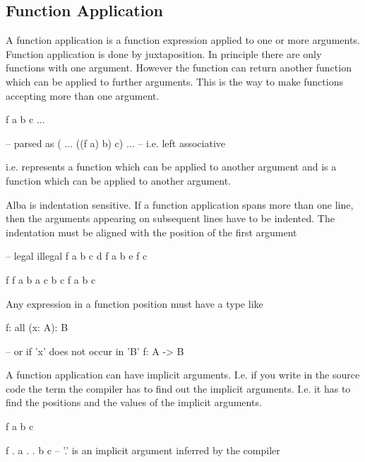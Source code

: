 \subsection{Function Application}

A function application is a function expression applied to one or more
arguments. Function application is done by juxtaposition. In principle there are
only functions with one argument. However the function can return another
function which can be applied to further arguments. This is the way to make
functions accepting more than one argument.

\begin{alba}
    f a b c ...

    -- parsed as
    ( ... ((f a) b) c) ...  -- i.e. left associative
\end{alba}
i.e.  represents a function which can be applied to another argument
and  is a function which can be applied to another argument.

Alba is indentation sensitive. If a function application spans more than one
line, then the arguments appearing on subsequent  lines have to be indented. The
indentation must be aligned with the position of the first argument
\begin{alba}
    -- legal                                illegal
    f a b c d                               f  a b
      e f                                    c

    f                                       f  a b
        a                                        c
        b
        c                                   f
                                            a b c
\end{alba}




Any expression in a function position must have a type like
\begin{alba}
    f: all (x: A): B

    -- or if 'x' does not occur in 'B'
    f: A -> B
\end{alba}

A function application can have implicit arguments. I.e. if you write in the
source code the term  the compiler has to find out the implicit
arguments. I.e. it has to find the positions and the values of the implicit
arguments.
\begin{alba}
    f a b c

    f . a . . b c    -- '.' is an implicit argument inferred by the compiler
\end{alba}

